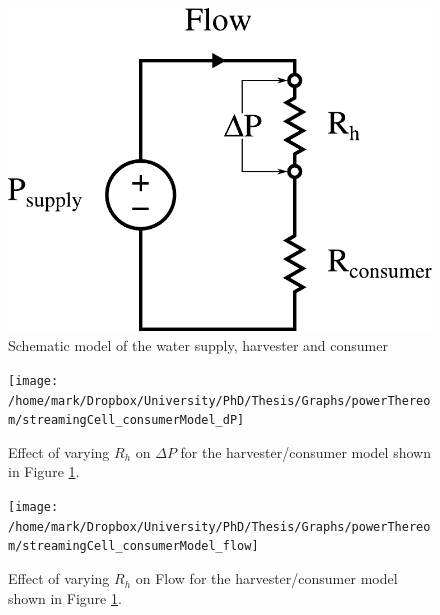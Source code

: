 \begin{figure}
\begin{centering}
\includegraphics[scale=0.55]{content/pt1/01-PowerHarvesting/Harvester_equivalentCircuit_output}
\par\end{centering}

\protect\caption{\label{fig:Schematic-model-of-harvester}Schematic model of the water
supply, harvester and consumer}


\end{figure}


\begin{figure}
\begin{centering}
\texttt{[image: /home/mark/Dropbox/University/PhD/Thesis/Graphs/powerThereom/streamingCell\_consumerModel\_dP]}
\par\end{centering}

\protect\caption{\label{fig:Effect-of-varying-Rh-onP}Effect of varying $R_{h}$ on
$\Delta P$ for the harvester/consumer model shown in Figure \ref{fig:Schematic-model-of-harvester}.}


\end{figure}


\begin{figure}
\begin{centering}
\texttt{[image: /home/mark/Dropbox/University/PhD/Thesis/Graphs/powerThereom/streamingCell\_consumerModel\_flow]}
\par\end{centering}

\protect\caption{\label{fig:Effect-of-varying-Rh-onFlow}Effect of varying $R_{h}$
on Flow for the harvester/consumer model shown in Figure \ref{fig:Schematic-model-of-harvester}.}
\end{figure}


